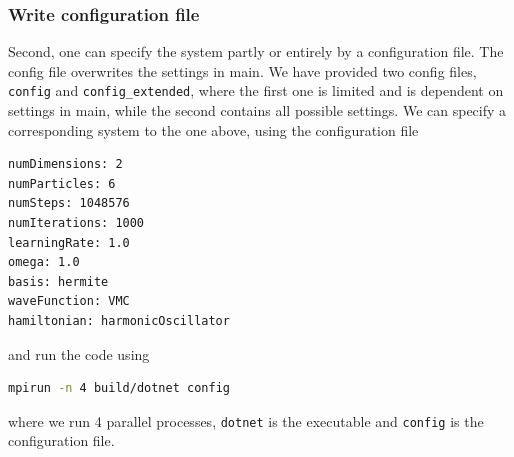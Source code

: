 \subsubsection{Write configuration file}
Second, one can specify the system partly or entirely by a configuration file. The config file overwrites the settings in main. We have provided two config files, \texttt{config} and \texttt{config\_extended}, where the first one is limited and is dependent on settings in main, while the second contains all possible settings. We can specify a corresponding system to the one above, using the configuration file
\lstset{basicstyle=\scriptsize}
\begin{lstlisting}[language={bash}]
numDimensions: 2
numParticles: 6
numSteps: 1048576
numIterations: 1000
learningRate: 1.0
omega: 1.0
basis: hermite
waveFunction: VMC
hamiltonian: harmonicOscillator
\end{lstlisting}
and run the code using
\begin{lstlisting}[language={bash}]
mpirun -n 4 build/dotnet config
\end{lstlisting}
where we run 4 parallel processes, \texttt{dotnet} is the executable and \texttt{config} is the configuration file. 
